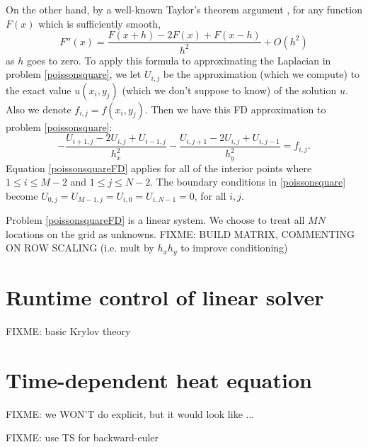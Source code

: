 On the other hand, by a well-known Taylor's theorem argument \citep{MortonMayers}, for any function $F(x)$ which is sufficiently smooth,
    $$F''(x) = \frac{F(x+h) - 2 F(x) + F(x-h)}{h^2} + O(h^2)$$
as $h$ goes to zero.  To apply this formula to approximating the Laplacian in problem \eqref{poissonsquare}, we let $U_{i,j}$ be the approximation (which we compute) to the exact value $u(x_i,y_j)$ (which we don't suppose to know) of the solution $u$.  Also we denote $f_{i,j} = f(x_i,y_j)$.  Then we have this FD approximation to problem \eqref{poissonsquare}:
\begin{equation}
- \frac{U_{i+1,j} - 2 U_{i,j} + U_{i-1,j}}{h_x^2} - \frac{U_{i,j+1} - 2 U_{i,j} + U_{i,j-1}}{h_y^2} = f_{i,j}. \label{poissonsquareFD}
\end{equation}
Equation \eqref{poissonsquareFD} applies for all of the interior points where $1 \le i \le M-2$ and $1 \le j \le N-2$.  The boundary conditions in \eqref{poissonsquare} become $U_{0,j} = U_{M-1,j} = U_{i,0} = U_{i,N-1} = 0$, for all $i,j$.

Problem \eqref{poissonsquareFD} is a linear system.  We choose to treat all $MN$ locations on the grid as unknowns. FIXME: BUILD MATRIX, COMMENTING ON ROW SCALING (i.e. mult by $h_x h_y$ to improve conditioning)






\section{Runtime control of linear solver}

FIXME: basic Krylov theory

\section{Time-dependent heat equation}

FIXME: we WON'T do explicit, but it would look like ...

FIXME: use TS for backward-euler

